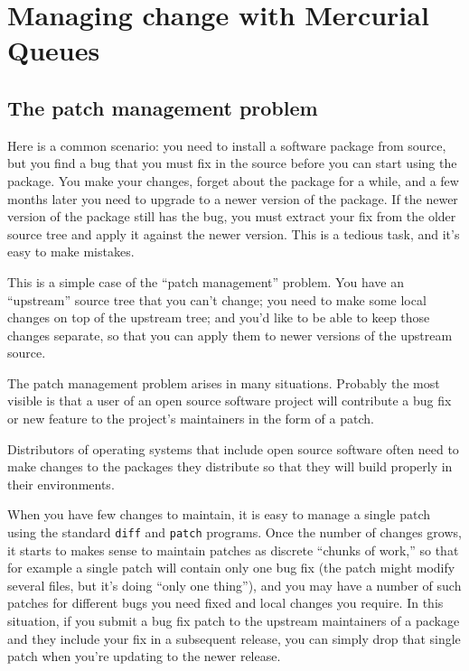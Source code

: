 \chapter{Managing change with Mercurial Queues}
\label{chap:mq}

\section{The patch management problem}
\label{sec:mq:patch-mgmt}

Here is a common scenario: you need to install a software package from
source, but you find a bug that you must fix in the source before you
can start using the package.  You make your changes, forget about the
package for a while, and a few months later you need to upgrade to a
newer version of the package.  If the newer version of the package
still has the bug, you must extract your fix from the older source
tree and apply it against the newer version.  This is a tedious task,
and it's easy to make mistakes.

This is a simple case of the ``patch management'' problem.  You have
an ``upstream'' source tree that you can't change; you need to make
some local changes on top of the upstream tree; and you'd like to be
able to keep those changes separate, so that you can apply them to
newer versions of the upstream source.

The patch management problem arises in many situations.  Probably the
most visible is that a user of an open source software project will
contribute a bug fix or new feature to the project's maintainers in the
form of a patch.

Distributors of operating systems that include open source software
often need to make changes to the packages they distribute so that
they will build properly in their environments.

When you have few changes to maintain, it is easy to manage a single
patch using the standard \texttt{diff} and \texttt{patch} programs.
Once the number of changes grows, it starts to makes sense to maintain
patches as discrete ``chunks of work,'' so that for example a single
patch will contain only one bug fix (the patch might modify several
files, but it's doing ``only one thing''), and you may have a number
of such patches for different bugs you need fixed and local changes
you require.  In this situation, if you submit a bug fix patch to the
upstream maintainers of a package and they include your fix in a
subsequent release, you can simply drop that single patch when you're
updating to the newer release.

